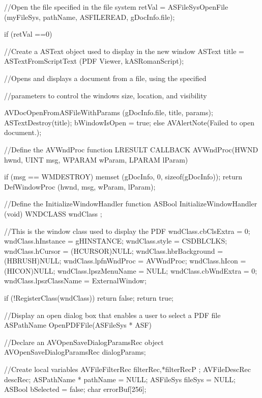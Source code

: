 \documentclass[letterpaper,12pt,english,openany,oneside]{sphinxmanual}
\begin{document}
\begin{sphinxVerbatim}[commandchars=\\\{\}]
//Open the file specified in the file system
   retVal = ASFileSysOpenFile (myFileSys, pathName, ASFILE\PYGZus{}READ,
   \PYGZam{}gDocInfo.file);

   if (retVal ==0) \PYGZob{}

//Create a ASText object used to display in the new window
      ASText title = ASTextFromScriptText (\PYGZdq{}PDF Viewer\PYGZdq{}, kASRomanScript);

//Opens and displays a document from a file, using the specified

//parameters to control the window\PYGZsq{}s size, location, and visibility

      AVDocOpenFromASFileWithParams (gDocInfo.file, title, \PYGZam{}params);
         ASTextDestroy(title);
         bWindowIsOpen = true;
   \PYGZcb{} else
         AVAlertNote(\PYGZdq{}Failed to open document.\PYGZdq{});
   \PYGZcb{}
   \PYGZcb{}
   \PYGZcb{}

//Define the AVWndProc function
   LRESULT CALLBACK AVWndProc(HWND hwnd, UINT msg, WPARAM wParam, LPARAM lParam)

   \PYGZob{}
   if (msg == WM\PYGZus{}DESTROY)
   memset (\PYGZam{}gDocInfo, 0, sizeof(gDocInfo));
   return DefWindowProc (hwnd, msg, wParam, lParam);
   \PYGZcb{}

//Define the InitializeWindowHandler function
   ASBool InitializeWindowHandler (void)
   \PYGZob{}
   WNDCLASS wndClass ;

//This is the window class used to display the PDF
   wndClass.cbClsExtra     = 0;
   wndClass.hInstance      = gHINSTANCE;
   wndClass.style               = CS\PYGZus{}DBLCLKS;
   wndClass.hCursor          = (HCURSOR)NULL;
   wndClass.hbrBackground  = (HBRUSH)NULL;
   wndClass.lpfnWndProc    = AVWndProc;
   wndClass.hIcon               = (HICON)NULL;
   wndClass.lpszMenuName   = NULL;
   wndClass.cbWndExtra     = 0;
   wndClass.lpszClassName  = \PYGZdq{}ExternalWindow\PYGZdq{};

   if (!RegisterClass(\PYGZam{}wndClass))
   return false;
   return true;
   \PYGZcb{}


//Display an open dialog box that enables a user to select a PDF file
   ASPathName OpenPDFFile(ASFileSys * ASF)

   \PYGZob{}

//Declare an AVOpenSaveDialogParamsRec object
   AVOpenSaveDialogParamsRec dialogParams;

//Create local variables
   AVFileFilterRec filterRec,*filterRecP ;
   AVFileDescRec descRec;
   ASPathName * pathName = NULL;
   ASFileSys fileSys = NULL;
   ASBool bSelected = false;
   char errorBuf[256];


\end{sphinxVerbatim}
\end{document}
